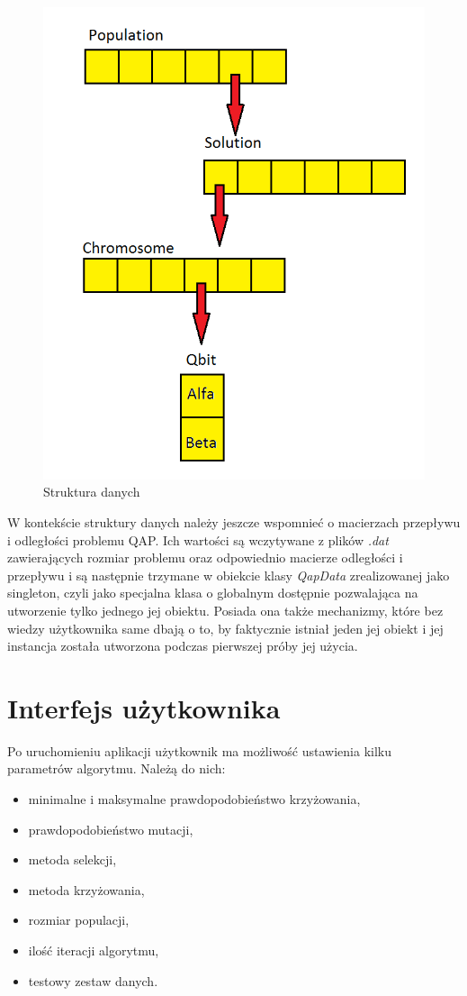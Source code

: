 \begin{figure}[!t]
\includegraphics[scale=0.4]{data_structure}
\caption{Struktura danych}
\end{figure}

W kontekście struktury danych należy jeszcze wspomnieć o macierzach przepływu i odległości problemu QAP. Ich wartości są wczytywane z plików \textit{.dat} zawierających rozmiar problemu oraz odpowiednio macierze odległości i przepływu i są następnie trzymane w obiekcie klasy \textit{QapData} zrealizowanej jako singleton, czyli jako specjalna klasa o globalnym dostępnie pozwalająca na utworzenie tylko jednego jej obiektu. Posiada ona także mechanizmy, które bez wiedzy użytkownika same dbają o to, by faktycznie istniał jeden jej obiekt i jej instancja została utworzona podczas pierwszej próby jej użycia.

\section{Interfejs użytkownika}
Po uruchomieniu aplikacji użytkownik ma możliwość ustawienia kilku parametrów algorytmu. Należą do nich:
\begin{itemize}
\item minimalne i maksymalne prawdopodobieństwo krzyżowania,
\item prawdopodobieństwo mutacji,
\item metoda selekcji,
\item metoda krzyżowania,
\item rozmiar populacji,
\item ilość iteracji algorytmu,
\item testowy zestaw danych.
\end{itemize}


